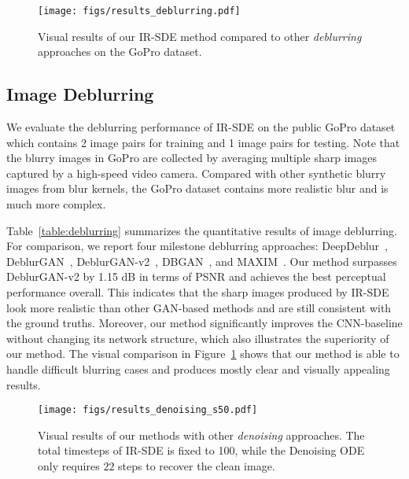 \documentclass{article}
\theoremstyle{plain}
\theoremstyle{definition}
\theoremstyle{remark}
\begin{document}
\begin{figure}[t]
\begin{center}
\centerline{\texttt{[image: figs/results\_deblurring.pdf]}}\vspace{-2.0mm}
\caption{Visual results of our IR-SDE method compared to other \emph{deblurring} approaches on the GoPro dataset.}
\label{fig:deblurring_results}
\end{center}
\vskip -0.2in
\end{figure}




\subsection{Image Deblurring}

We evaluate the deblurring performance of IR-SDE on the public GoPro dataset~\cite{nah2017deep} which contains 2 image pairs for training and 1 image pairs for testing. Note that the blurry images in GoPro are collected by averaging multiple sharp images captured by a high-speed video camera. Compared with other synthetic blurry images from blur kernels, the GoPro dataset contains more realistic blur and is much more complex. 

Table~\ref{table:deblurring} summarizes the quantitative results of image deblurring. For comparison, we report four milestone deblurring approaches: DeepDeblur~\cite{nah2017deep}, DeblurGAN~\cite{kupyn2018deblurgan}, DeblurGAN-v2~\cite{kupyn2019deblurgan}, DBGAN~\cite{zhang2020deblurring}, and MAXIM~\cite{tu2022maxim}. Our method surpasses DeblurGAN-v2 by 1.15 dB in terms of PSNR and achieves the best perceptual performance overall. This indicates that the sharp images produced by IR-SDE look more realistic than other GAN-based methods and are still consistent with the ground truths. Moreover, our method significantly improves the CNN-baseline without changing its network structure, which also illustrates the superiority of our method. The visual comparison in Figure~\ref{fig:deblurring_results} shows that our method is able to handle difficult blurring cases and produces mostly clear and visually appealing results.



\begin{figure}[t]
\begin{center}
\centerline{\texttt{[image: figs/results\_denoising\_s50.pdf]}}\vspace{-2.0mm}
\caption{Visual results of our methods with other \emph{denoising} approaches. The total timesteps of IR-SDE is fixed to 100, while the Denoising ODE only requires $\textit{22}$ steps to recover the clean image.}
\label{fig:denoising_results}
\end{center}
\vskip -0.2in
\end{figure}
\end{document}
